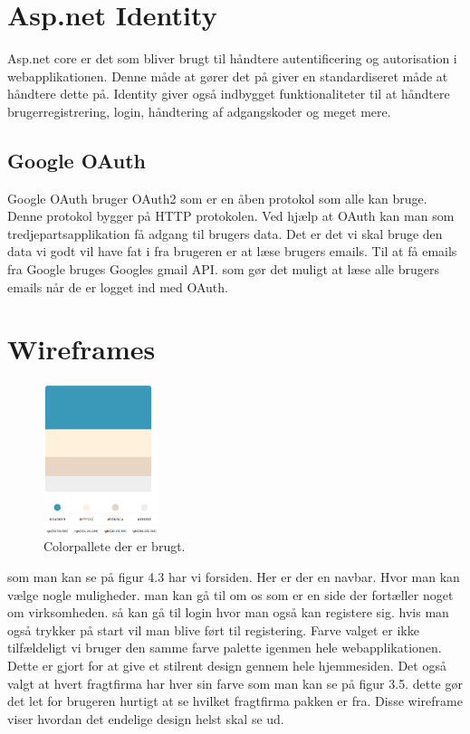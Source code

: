 \bigbreak


\section{Asp.net Identity}
Asp.net core er det som bliver brugt til håndtere autentificering og autorisation i webapplikationen.
Denne måde at gører det på giver en standardiseret måde at håndtere dette på. Identity giver også indbygget
funktionaliteter til at håndtere brugerregistrering, login, håndtering af adgangskoder og meget mere.

\subsection{Google OAuth}
Google OAuth bruger OAuth2 som er en åben protokol som alle kan bruge. Denne protokol bygger på
HTTP protokolen. Ved hjælp at OAuth kan man som tredjepartsapplikation få adgang til brugers data.
Det er det vi skal bruge den data vi godt vil have fat i fra brugeren er at læse brugers emails. 
Til at få emails fra Google bruges Googles gmail API. som gør det muligt at læse alle brugers emails når de
er logget ind med OAuth.

\section{Wireframes}

\begin{figure} 
    \includegraphics[width=0.3\textwidth]{./Pictures/Colorpallete.png}
    \caption{Colorpallete der er brugt.}
    \label{fig:Colorpallete}
\end{figure}

som man kan se på figur 4.3 har vi forsiden. Her er der en navbar. Hvor man kan vælge nogle muligheder. man
kan gå til om os som er en side der fortæller noget om virksomheden. så kan gå til login hvor man også kan registere sig.
hvis man også trykker på start vil man blive ført til registering. Farve valget er ikke tilfældeligt vi bruger den samme farve
palette igenmen hele webapplikationen. Dette er gjort for at give et stilrent design gennem hele hjemmesiden. Det også valgt at hvert
fragtfirma har hver sin farve som man kan se på figur 3.5. dette gør det let for brugeren hurtigt at se hvilket fragtfirma pakken er fra.
Disse wireframe viser hvordan det endelige design helst skal se ud.


